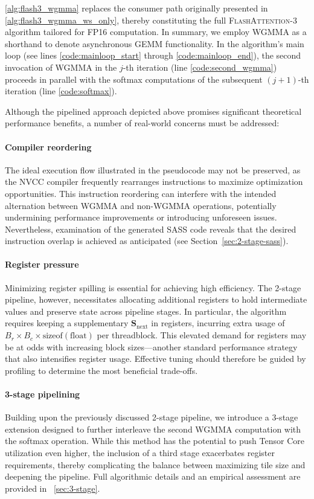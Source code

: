 \cref{alg:flash3_wgmma} replaces the consumer path originally presented in \cref{alg:flash3_wgmma_ws_only}, thereby constituting the full \textsc{FlashAttention-3} algorithm tailored for FP16 computation. In summary, we employ WGMMA as a shorthand to denote asynchronous GEMM functionality. In the algorithm’s main loop (see lines \ref{code:mainloop_start} through \ref{code:mainloop_end}), the second invocation of WGMMA in the $j$-th iteration (line \ref{code:second_wgmma}) proceeds in parallel with the softmax computations of the subsequent $(j+1)$-th iteration (line \ref{code:softmax}).

Although the pipelined approach depicted above promises significant theoretical performance benefits, a number of real-world concerns must be addressed:

\paragraph{Compiler reordering} The ideal execution flow illustrated in the pseudocode may not be preserved, as the NVCC compiler frequently rearranges instructions to maximize optimization opportunities. This instruction reordering can interfere with the intended alternation between WGMMA and non-WGMMA operations, potentially undermining performance improvements or introducing unforeseen issues. Nevertheless, examination of the generated SASS code reveals that the desired instruction overlap is achieved as anticipated (see Section~\ref{sec:2-stage-sass}).

\paragraph{Register pressure} Minimizing register spilling is essential for achieving high efficiency. The 2-stage pipeline, however, necessitates allocating additional registers to hold intermediate values and preserve state across pipeline stages. In particular, the algorithm requires keeping a supplementary $\mathbf{S}_{\mathrm{next}}$ in registers, incurring extra usage of $B_r \times B_c \times \text{sizeof}(\text{float})$ per threadblock. This elevated demand for registers may be at odds with increasing block sizes—another standard performance strategy that also intensifies register usage. Effective tuning should therefore be guided by profiling to determine the most beneficial trade-offs.

\paragraph{3-stage pipelining} Building upon the previously discussed 2-stage pipeline, we introduce a 3-stage extension designed to further interleave the second WGMMA computation with the softmax operation. While this method has the potential to push Tensor Core utilization even higher, the inclusion of a third stage exacerbates register requirements, thereby complicating the balance between maximizing tile size and deepening the pipeline. Full algorithmic details and an empirical assessment are provided in ~\cref{sec:3-stage}.

